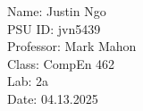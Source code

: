 \documentclass[letterpaper, 11pt]{article}
\def\class{CompEn 462}
\def\homeworkNumber{2a}
\def\date{04.13.2025}
\def\professor{Mark Mahon}
\begin{document}
\hfill
\newline
Name: Justin Ngo
\\PSU ID: jvn5439
\\Professor: \professor
\\Class: \class
\\Lab: \homeworkNumber
\\Date: \date
\end{document}
